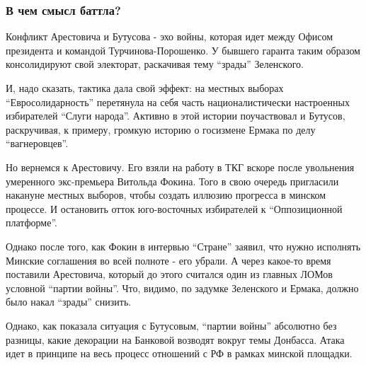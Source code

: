  
 
 

\subsubsection{В чем смысл баттла?}
\label{sec:18_11_2020.news.ua.strana.1.battle_ljusenka_jura_ilovajskii.smysl_battla}

Конфликт Арестовича и Бутусова - эхо войны, которая идет между Офисом
президента и командой Турчинова-Порошенко. У бывшего гаранта таким образом
консолидируют свой электорат, раскачивая тему \enquote{зрады} Зеленского.

И, надо сказать, тактика дала свой эффект: на местных выборах
\enquote{Евросолидарность} перетянула на себя часть националистически настроенных
избирателей \enquote{Слуги народа}. Активно в этой истории поучаствовал и Бутусов,
раскручивая, к примеру, громкую историю о госизмене Ермака по делу
\enquote{вагнеровцев}. 

Но вернемся к Арестовичу. Его взяли на работу в ТКГ вскоре после
увольнения умеренного экс-премьера Витольда Фокина. Того в свою очередь
пригласили накануне местных выборов, чтобы создать иллюзию прогресса в
минском процессе. И остановить отток юго-восточных избирателей к
\enquote{Оппозиционной платформе}. 

Однако после того, как Фокин в интервью \enquote{Стране}
заявил,
что нужно исполнять Минские соглашения во всей полноте - его убрали. А через
какое-то время поставили Арестовича, который до этого считался один из главных
ЛОМов условной \enquote{партии войны}. Что, видимо, по задумке Зеленского и Ермака,
должно было накал \enquote{зрады} снизить. 

Однако, как показала ситуация с Бутусовым, \enquote{партии войны} абсолютно без
разницы, какие декорации на Банковой возводят вокруг темы Донбасса. Атака
идет в принципе на весь процесс отношений с РФ в рамках минской площадки.

